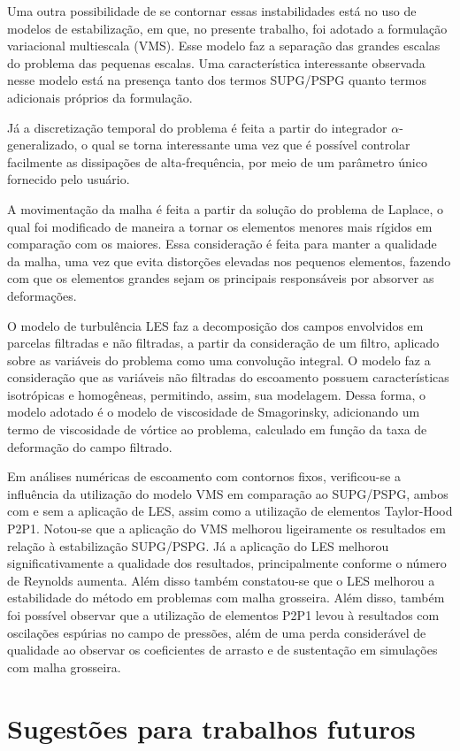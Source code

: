 Uma outra possibilidade de se contornar essas instabilidades está no uso de modelos de estabilização, em que, no presente trabalho, foi adotado a formulação variacional multiescala (VMS). Esse modelo faz a separação das grandes escalas do problema das pequenas escalas. Uma característica interessante observada nesse modelo está na presença tanto dos termos SUPG/PSPG quanto termos adicionais próprios da formulação.

Já a discretização temporal do problema é feita a partir do integrador $\alpha$-generalizado, o qual se torna interessante uma vez que é possível controlar facilmente as dissipações de alta-frequência, por meio de um parâmetro único fornecido pelo usuário.

A movimentação da malha é feita a partir da solução do problema de Laplace, o qual foi modificado de maneira a tornar os elementos menores mais rígidos em comparação com os maiores. Essa consideração é feita para manter a qualidade da malha, uma vez que evita distorções elevadas nos pequenos elementos, fazendo com que os elementos grandes sejam os principais responsáveis por absorver as deformações.

O modelo de turbulência LES faz a decomposição dos campos envolvidos em parcelas filtradas e não filtradas, a partir da consideração de um filtro, aplicado sobre as variáveis do problema como uma convolução integral. O modelo faz a consideração que as variáveis não filtradas do escoamento possuem características isotrópicas e homogêneas, permitindo, assim, sua modelagem. Dessa forma, o modelo adotado é o modelo de viscosidade de Smagorinsky, adicionando um termo de viscosidade de vórtice ao problema, calculado em função da taxa de deformação do campo filtrado.

Em análises numéricas de escoamento com contornos fixos, verificou-se a influência da utilização do modelo VMS em comparação ao SUPG/PSPG, ambos com e sem a aplicação de LES, assim como a utilização de elementos Taylor-Hood P2P1. Notou-se que a aplicação do VMS melhorou ligeiramente os resultados em relação à estabilização SUPG/PSPG. Já a aplicação do LES melhorou significativamente a qualidade dos resultados, principalmente conforme o número de Reynolds aumenta. Além disso também constatou-se que o LES melhorou a estabilidade do método em problemas com malha grosseira. Além disso, também foi possível observar que a utilização de elementos P2P1 levou à resultados com oscilações espúrias no campo de pressões, além de uma perda considerável de qualidade ao observar os coeficientes de arrasto e de sustentação em simulações com malha grosseira.



\section{Sugestões para trabalhos futuros} \label{Sugestoes}
